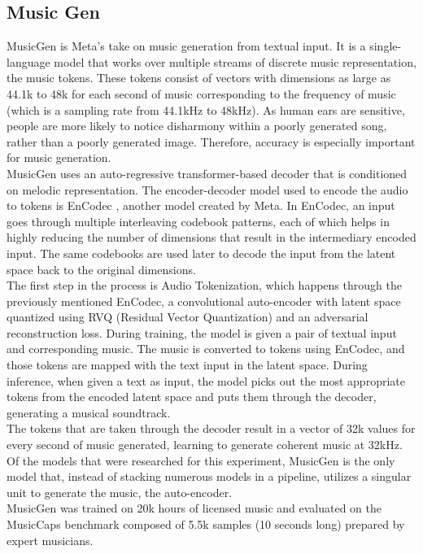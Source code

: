 \documentclass[conference]{IEEEtran}
\begin{document}
\subsection{Music Gen}
{
MusicGen \citep{copet2023simple} is Meta’s take on music generation from textual input. It is a single-language model that works over multiple streams of discrete music representation, the music tokens. These tokens consist of vectors with dimensions as large as 44.1k to 48k for each second of music corresponding to the frequency of music (which is a sampling rate from 44.1kHz to 48kHz). As human ears are sensitive, people are more likely to notice disharmony within a poorly generated song, rather than a poorly generated image. Therefore, accuracy is especially important for music generation.
\\

MusicGen uses an auto-regressive transformer-based decoder that is conditioned on melodic representation. The encoder-decoder model used to encode the audio to tokens is EnCodec \citep{defossez2022high}, another model created by Meta. In EnCodec, an input goes through multiple interleaving codebook patterns, each of which helps in highly reducing the number of dimensions that result in the intermediary encoded input. The same codebooks are used later to decode the input from the latent space back to the original dimensions.
\\

The first step in the process is Audio Tokenization, which happens through the previously mentioned EnCodec, a convolutional auto-encoder with latent space quantized using RVQ (Residual Vector Quantization) and an adversarial reconstruction loss. 
During training, the model is given a pair of textual input and corresponding music. The music is converted to tokens using EnCodec, and those tokens are mapped with the text input in the latent space. During inference, when given a text as input, the model picks out the most appropriate tokens from the encoded latent space and puts them through the decoder, generating a musical soundtrack. 
\\

The tokens that are taken through the decoder result in a vector of 32k values for every second of music generated, learning to generate coherent music at 32kHz. Of the models that were researched for this experiment, MusicGen is the only model that, instead of stacking numerous models in a pipeline, utilizes a singular unit to generate the music, the auto-encoder.
\\

MusicGen was trained on 20k hours of licensed music and evaluated on the MusicCaps benchmark composed of 5.5k samples (10 seconds long) prepared by expert musicians.
}
\end{document}
